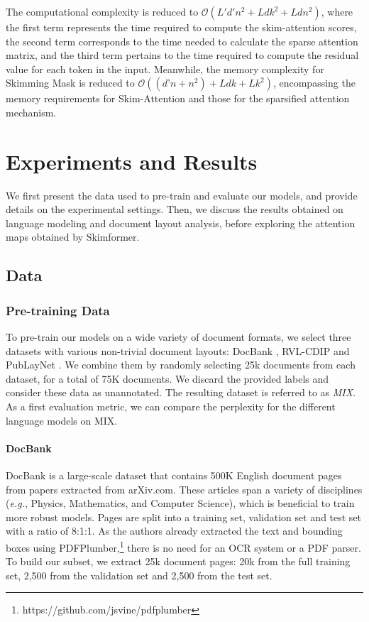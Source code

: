 The computational complexity is reduced to $\mathcal{O}(L'd'n^2 + Ldk^2 + Ldn^2)$, where the first term represents the time required to compute the skim-attention scores, the second term corresponds to the time needed to calculate the sparse attention matrix, and the third term pertains to the time required to compute the residual value for each token in the input. Meanwhile, the memory complexity for Skimming Mask is reduced to $\mathcal{O}((d’n + n^2) + Ldk + Lk^2)$, encompassing the memory requirements for Skim-Attention and those for the sparsified attention mechanism.

\section{Experiments and Results}

We first present the data used to pre-train and evaluate our models, and provide details on the experimental settings. Then, we discuss the results obtained on language modeling and document layout analysis, before exploring the attention maps obtained by Skimformer.

\subsection{Data}

\subsubsection{Pre-training Data}

To pre-train our models on a wide variety of document formats, we select three datasets with various non-trivial document layouts: DocBank \citep{li2020docbank}, RVL-CDIP \citep{harley2015evaluation} and PubLayNet \citep{zhong2019publaynet}. We combine them by randomly selecting 25k documents from each dataset, for a total of 75K documents. We discard the provided labels and consider these data as unannotated. The resulting dataset is referred to as \textit{MIX}. As a first evaluation metric, we can compare the perplexity for the different language models on MIX. 

\paragraph{DocBank}

DocBank is a large-scale dataset that contains 500K English document pages from papers extracted from arXiv.com. These articles span a variety of disciplines (\textit{e.g.}, Physics, Mathematics, and Computer Science), which is beneficial to train more robust models. Pages are split into a training set, validation set and test set with a ratio of 8:1:1. As the authors already extracted the text and bounding boxes using PDFPlumber,\footnote{https://github.com/jsvine/pdfplumber} there is no need for an \ac{OCR} system or a PDF parser. To build our subset, we extract 25k document pages: 20k from the full training set, 2,500 from the validation set and 2,500 from the test set. 

